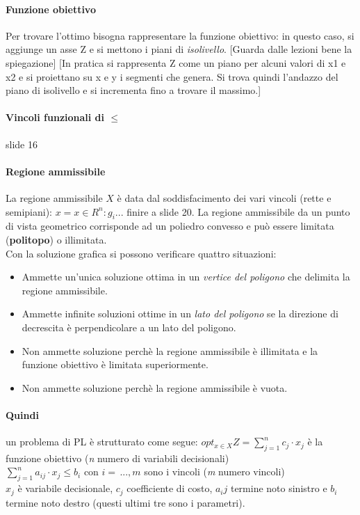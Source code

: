 \documentclass[12pt, a4paper, openany]{book}
\begin{document}
\paragraph*{Funzione obiettivo}
Per trovare l'ottimo bisogna rappresentare la funzione obiettivo: in questo caso, si aggiunge un asse Z e si mettono i piani di \emph{isolivello}.
[Guarda dalle lezioni bene la spiegazione] [In pratica si rappresenta Z come un piano per alcuni valori di x1 e x2 e si proiettano su x e y i segmenti che genera.
Si trova quindi l'andazzo del piano di isolivello e si incrementa fino a trovare il massimo.]
\paragraph*{Vincoli funzionali di $\leq$} slide 16
\paragraph*{Regione ammissibile} La regione ammissibile $X$ è data dal soddisfacimento dei vari vincoli (rette e semipiani):
$x= x\in {R}^n : g_i ...$ finire a slide 20.
La regione ammissibile da un punto di vista geometrico corrisponde ad un poliedro convesso e può essere limitata (\textbf{politopo}) o illimitata.
\\Con la soluzione grafica si possono verificare quattro situazioni:
\begin{itemize}
    \item Ammette un'unica soluzione ottima in un \emph{vertice del poligono} che delimita la regione ammissibile.
    \item Ammette infinite soluzioni ottime in un \emph{lato del poligono} se la direzione di decrescita è perpendicolare a un lato del poligono.
    \item Non ammette soluzione perchè la regione ammissibile è illimitata e la funzione obiettivo è limitata superiormente.
    \item Non ammette soluzione perchè la regione ammissibile è vuota.
\end{itemize}
\paragraph*{Quindi} un problema di PL è strutturato come segue:
$opt_{x\in X} Z = \sum_{j=1}^{n} c_j\cdot x_j$ è la funzione obiettivo (\emph{n} numero di variabili decisionali)
\\ $\sum_{j=1}^n a_{ij} \cdot x_j \leq b_i$ con $i=\,...,m$ sono i vincoli (\emph{m} numero vincoli)
\\$x_j$ è variabile decisionale, $c_j$ coefficiente di costo, $a_ij$ termine noto sinistro e $b_i$ termine noto destro (questi ultimi tre sono i parametri).
\end{document}
